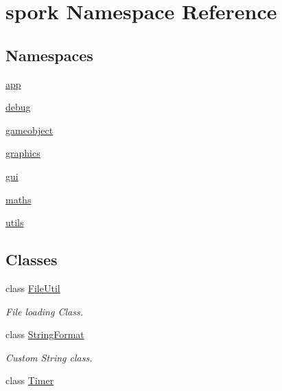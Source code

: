 \hypertarget{namespacespork}{}\section{spork Namespace Reference}
\label{namespacespork}
\subsection*{Namespaces}
\begin{DoxyCompactItemize}
\item 
 \hyperlink{namespacespork_1_1app}{app}
\item 
 \hyperlink{namespacespork_1_1debug}{debug}
\item 
 \hyperlink{namespacespork_1_1gameobject}{gameobject}
\item 
 \hyperlink{namespacespork_1_1graphics}{graphics}
\item 
 \hyperlink{namespacespork_1_1gui}{gui}
\item 
 \hyperlink{namespacespork_1_1maths}{maths}
\item 
 \hyperlink{namespacespork_1_1utils}{utils}
\end{DoxyCompactItemize}
\subsection*{Classes}
\begin{DoxyCompactItemize}
\item 
class \hyperlink{classspork_1_1_file_util}{File\+Util}
\begin{DoxyCompactList}\small\item\em File loading Class. \end{DoxyCompactList}\item 
class \hyperlink{classspork_1_1_string_format}{String\+Format}
\begin{DoxyCompactList}\small\item\em Custom String class. \end{DoxyCompactList}\item 
class \hyperlink{classspork_1_1_timer}{Timer}
\end{DoxyCompactItemize}
